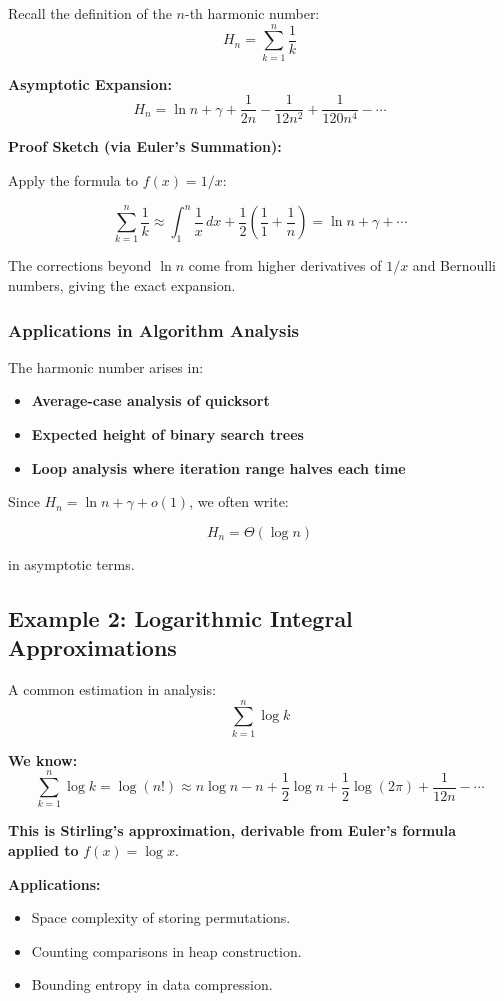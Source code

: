 \documentclass{article}
\begin{document}
Recall the definition of the $n$-th harmonic number:
\[
H_n = \sum_{k=1}^{n} \frac{1}{k}
\]

\textbf{Asymptotic Expansion:}
\[
H_n = \ln n + \gamma + \frac{1}{2n} - \frac{1}{12n^2} + \frac{1}{120n^4} - \cdots
\]

\textbf{Proof Sketch (via Euler’s Summation):}

Apply the formula to $f(x) = 1/x$:

\[
\sum_{k=1}^{n} \frac{1}{k} \approx \int_1^n \frac{1}{x}\,dx + \frac{1}{2} \left(\frac{1}{1} + \frac{1}{n} \right)
= \ln n + \gamma + \cdots
\]

The corrections beyond $\ln n$ come from higher derivatives of $1/x$ and Bernoulli numbers, giving the exact expansion.

\subsubsection*{Applications in Algorithm Analysis}

The harmonic number arises in:
\begin{itemize}
    \item \textbf{Average-case analysis of quicksort}
    \item \textbf{Expected height of binary search trees}
    \item \textbf{Loop analysis where iteration range halves each time}
\end{itemize}

Since $H_n = \ln n + \gamma + o(1)$, we often write:

\[
H_n = \Theta(\log n)
\]

in asymptotic terms.

\subsection*{Example 2: Logarithmic Integral Approximations}

A common estimation in analysis:
\[
\sum_{k=1}^{n} \log k
\]

\textbf{We know:}
\[
\sum_{k=1}^{n} \log k = \log(n!) \approx n \log n - n + \frac{1}{2} \log n + \frac{1}{2} \log(2\pi) + \frac{1}{12n} - \cdots
\]

\textbf{This is Stirling’s approximation, derivable from Euler’s formula applied to } $f(x) = \log x$.

\textbf{Applications:}
\begin{itemize}
    \item Space complexity of storing permutations.
    \item Counting comparisons in heap construction.
    \item Bounding entropy in data compression.
\end{itemize}
\end{document}
